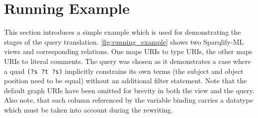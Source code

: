 \documentclass[a4paper,twoside,bibtotoc,abstracton,12pt,BCOR=15mm]{scrreprt}
\begin{document}
\section{Running Example}
This section introduces a simple example which is used for demonstrating the stages of the query translation.
\autoref{fig:running_example} shows two Sparqlify-ML views and
corresponding relations. One maps URIs to type URIs, the other maps URIs to literal comments.
The query was chosen as it demonstrates a case where a quad \texttt{(?s ?t ?s)} implicitly constrains its own terms (the subject and object position need to be equal)
without an additional filter statement. Note that the default graph URIs have been omitted for brevity in both the view and the query.
Also note, that each column referenced by the variable binding carries a datatype which must be taken into account during the rewriting.  
\end{document}
